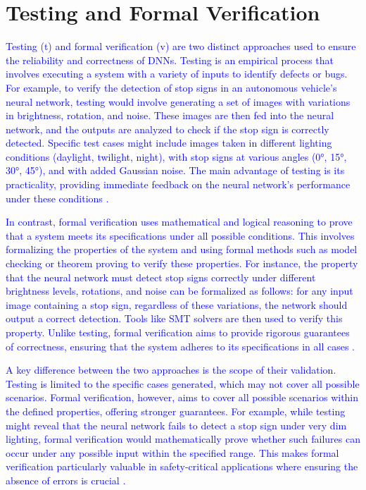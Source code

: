 
\section{Testing and Formal Verification}
\textcolor{blue}{
Testing (t) and formal verification (v) are two distinct approaches used to ensure the reliability and correctness of DNNs. Testing is an empirical process that involves executing a system with a variety of inputs to identify defects or bugs. For example, to verify the detection of stop signs in an autonomous vehicle's neural network, testing would involve generating a set of images with variations in brightness, rotation, and noise. These images are then fed into the neural network, and the outputs are analyzed to check if the stop sign is correctly detected. Specific test cases might include images taken in different lighting conditions (daylight, twilight, night), with stop signs at various angles (0°, 15°, 30°, 45°), and with added Gaussian noise. The main advantage of testing is its practicality, providing immediate feedback on the neural network’s performance under these conditions \cite{Albarghouthi}.}

\textcolor{blue}{In contrast, formal verification uses mathematical and logical reasoning to prove that a system meets its specifications under all possible conditions. This involves formalizing the properties of the system and using formal methods such as model checking or theorem proving to verify these properties. For instance, the property that the neural network must detect stop signs correctly under different brightness levels, rotations, and noise can be formalized as follows: for any input image containing a stop sign, regardless of these variations, the network should output a correct detection. Tools like SMT solvers are then used to verify this property. Unlike testing, formal verification aims to provide rigorous guarantees of correctness, ensuring that the system adheres to its specifications in all cases \cite{DeepMind2023, Albarghouthi}.}

\textcolor{blue}{A key difference between the two approaches is the scope of their validation. Testing is limited to the specific cases generated, which may not cover all possible scenarios. Formal verification, however, aims to cover all possible scenarios within the defined properties, offering stronger guarantees. For example, while testing might reveal that the neural network fails to detect a stop sign under very dim lighting, formal verification would mathematically prove whether such failures can occur under any possible input within the specified range. This makes formal verification particularly valuable in safety-critical applications where ensuring the absence of errors is crucial \cite{Urban2021}.}


